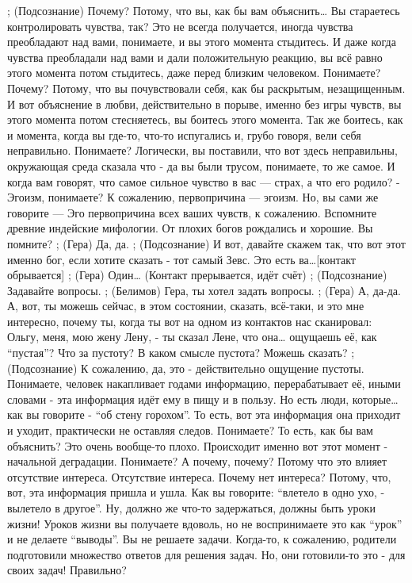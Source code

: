 ;	(Подсознание) Почему? Потому, что вы, как бы вам объяснить… Вы стараетесь контролировать чувства, так? Это не всегда получается, иногда чувства преобладают над вами, понимаете, и вы этого момента стыдитесь. И даже когда чувства преобладали над вами и дали положительную реакцию, вы всё равно этого момента потом стыдитесь, даже перед близким человеком. Понимаете? Почему? Потому, что вы почувствовали себя, как бы раскрытым, незащищенным. И вот объяснение в любви, действительно в порыве, именно без игры чувств, вы этого момента потом стесняетесь, вы боитесь этого момента.  Так же боитесь, как и момента, когда вы где-то, что-то испугались и, грубо говоря, вели себя неправильно. Понимаете? Логически, вы поставили, что вот здесь неправильны, окружающая среда сказала что - да вы были трусом, понимаете, то же самое. И когда вам говорят, что самое сильное чувство в вас — страх, а что его родило?  - Эгоизм, понимаете? К сожалению, первопричина — эгоизм. Но, вы сами же говорите — Эго первопричина всех ваших чувств, к сожалению. Вспомните древние индейские мифологии. От плохих богов рождались и хорошие. Вы помните? 
;	(Гера) Да, да.
;	(Подсознание) И вот, давайте скажем так, что вот этот именно бог, если хотите сказать - тот самый Зевс. Это есть ва…[контакт обрывается]
;	(Гера) Один…
(Контакт прерывается, идёт счёт)
;	(Подсознание) Задавайте вопросы.
;	(Белимов) Гера, ты хотел задать вопросы.
;	(Гера) А, да-да. А, вот, ты можешь сейчас, в этом состоянии, сказать, всё-таки, и это мне интересно, почему ты, когда ты вот на одном из контактов нас сканировал: Ольгу, меня, мою жену Лену, - ты сказал Лене, что она… ощущаешь её, как ``пустая''? Что за пустоту? В каком смысле пустота? Можешь сказать? 
;	(Подсознание) К сожалению, да, это - действительно ощущение пустоты. Понимаете, человек накапливает годами информацию, перерабатывает её, иными словами - эта информация идёт ему в пищу и в пользу. Но есть люди, которые…  как вы говорите - ``об стену горохом''. То есть, вот эта информация она приходит и уходит, практически не оставляя следов. Понимаете? То есть, как бы вам объяснить?  Это очень вообще-то плохо.  Происходит именно вот этот момент -  начальной деградации. Понимаете? А почему, почему? Потому что это влияет отсутствие интереса. Отсутствие интереса. Почему нет интереса? Потому,  что, вот, эта информация пришла  и ушла. Как вы говорите: ``влетело в одно ухо, -  вылетело в другое''.  Ну, должно же что-то задержаться, должны быть уроки жизни! Уроков жизни вы получаете вдоволь, но не воспринимаете это как ``урок'' и не делаете ``выводы''. Вы не решаете задачи. Когда-то, к сожалению, родители подготовили множество ответов для решения задач. Но, они готовили-то это - для своих задач! Правильно?
